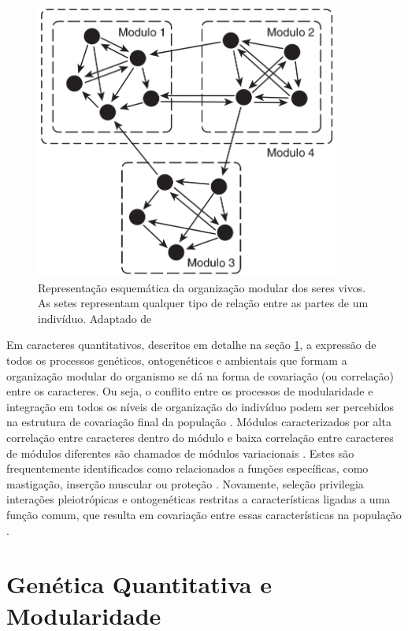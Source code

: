 \begin{figure}[h!]
  \centering
  \includegraphics[width=100mm]{figuras/modulos.png}
  \caption{Representação esquemática da organização modular dos seres
  vivos.
  As setes representam qualquer tipo de relação entre as partes
  de um indivíduo.
  Adaptado de \cite{Klingenberg2008}}
  \label{modulos}
\end{figure}

Em caracteres quantitativos, descritos em detalhe na seção
\ref{intro:genquant}, a expressão de todos os processos genéticos,
ontogenéticos e ambientais que formam a organização modular do organismo se
dá na forma de covariação (ou correlação) entre os caracteres.
Ou seja, o conflito entre os processos de modularidade e integração em todos os
níveis de organização do indivíduo podem ser percebidos na estrutura de
covariação final da população \citep{Klingenberg2008}.
Módulos caracterizados por alta correlação entre caracteres dentro do
módulo e baixa correlação entre caracteres de módulos diferentes são
chamados de módulos variacionais \citep{Wagner2007}.
Estes são frequentemente identificados como relacionados a funções
específicas, como mastigação, inserção muscular ou proteção
\citep{Cheverud1997}.
Novamente, seleção privilegia interações pleiotrópicas e ontogenéticas restritas
a características ligadas a uma função comum, que resulta em
covariação entre essas características na população \citep{Wagner1996}.


\section{Genética Quantitativa e Modularidade}\label{intro:genquant}

